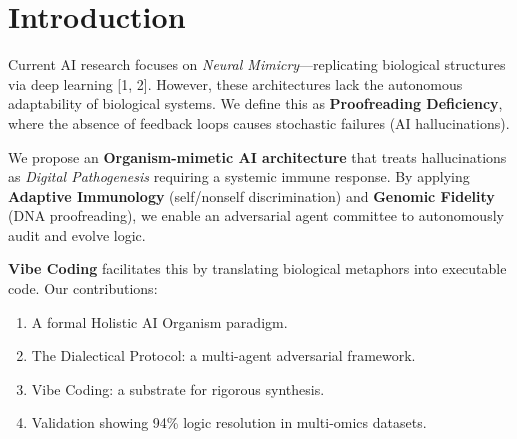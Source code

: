 \section{Introduction}
Current AI research focuses on \textit{Neural Mimicry}---replicating biological structures via deep learning [1, 2]. However, these architectures lack the autonomous adaptability of biological systems. We define this as \textbf{Proofreading Deficiency}, where the absence of feedback loops causes stochastic failures (AI hallucinations).

We propose an \textbf{Organism-mimetic AI architecture} that treats hallucinations as \textit{Digital Pathogenesis} requiring a systemic immune response. By applying \textbf{Adaptive Immunology} (self/nonself discrimination) and \textbf{Genomic Fidelity} (DNA proofreading), we enable an adversarial agent committee to autonomously audit and evolve logic.

\textbf{Vibe Coding} facilitates this by translating biological metaphors into executable code. Our contributions:
\begin{enumerate}
    \item A formal Holistic AI Organism paradigm.
    \item The Dialectical Protocol: a multi-agent adversarial framework.
    \item Vibe Coding: a substrate for rigorous synthesis.
    \item Validation showing 94\% logic resolution in multi-omics datasets.
\end{enumerate}
